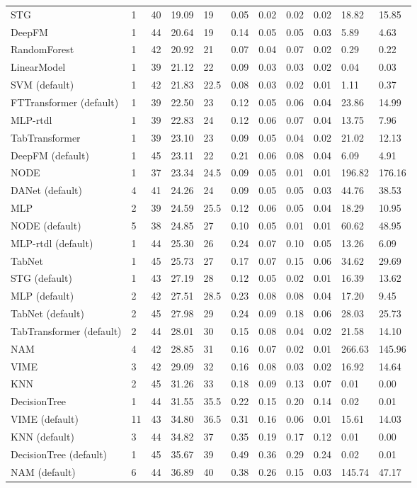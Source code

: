 \begin{tabular}{lllllllllll}
STG & 1 & 40 & 19.09 & 19 & 0.05 & 0.02 & 0.02 & 0.02 & 18.82 & 15.85 \\
DeepFM & 1 & 44 & 20.64 & 19 & 0.14 & 0.05 & 0.05 & 0.03 & 5.89 & 4.63 \\
RandomForest & 1 & 42 & 20.92 & 21 & 0.07 & 0.04 & 0.07 & 0.02 & 0.29 & 0.22 \\
LinearModel & 1 & 39 & 21.12 & 22 & 0.09 & 0.03 & 0.03 & 0.02 & 0.04 & 0.03 \\
SVM (default) & 1 & 42 & 21.83 & 22.5 & 0.08 & 0.03 & 0.02 & 0.01 & 1.11 & 0.37 \\
FTTransformer (default) & 1 & 39 & 22.50 & 23 & 0.12 & 0.05 & 0.06 & 0.04 & 23.86 & 14.99 \\
MLP-rtdl & 1 & 39 & 22.83 & 24 & 0.12 & 0.06 & 0.07 & 0.04 & 13.75 & 7.96 \\
TabTransformer & 1 & 39 & 23.10 & 23 & 0.09 & 0.05 & 0.04 & 0.02 & 21.02 & 12.13 \\
DeepFM (default) & 1 & 45 & 23.11 & 22 & 0.21 & 0.06 & 0.08 & 0.04 & 6.09 & 4.91 \\
NODE & 1 & 37 & 23.34 & 24.5 & 0.09 & 0.05 & 0.01 & 0.01 & 196.82 & 176.16 \\
DANet (default) & 4 & 41 & 24.26 & 24 & 0.09 & 0.05 & 0.05 & 0.03 & 44.76 & 38.53 \\
MLP & 2 & 39 & 24.59 & 25.5 & 0.12 & 0.06 & 0.05 & 0.04 & 18.29 & 10.95 \\
NODE (default) & 5 & 38 & 24.85 & 27 & 0.10 & 0.05 & 0.01 & 0.01 & 60.62 & 48.95 \\
MLP-rtdl (default) & 1 & 44 & 25.30 & 26 & 0.24 & 0.07 & 0.10 & 0.05 & 13.26 & 6.09 \\
TabNet & 1 & 45 & 25.73 & 27 & 0.17 & 0.07 & 0.15 & 0.06 & 34.62 & 29.69 \\
STG (default) & 1 & 43 & 27.19 & 28 & 0.12 & 0.05 & 0.02 & 0.01 & 16.39 & 13.62 \\
MLP (default) & 2 & 42 & 27.51 & 28.5 & 0.23 & 0.08 & 0.08 & 0.04 & 17.20 & 9.45 \\
TabNet (default) & 2 & 45 & 27.98 & 29 & 0.24 & 0.09 & 0.18 & 0.06 & 28.03 & 25.73 \\
TabTransformer (default) & 2 & 44 & 28.01 & 30 & 0.15 & 0.08 & 0.04 & 0.02 & 21.58 & 14.10 \\
NAM & 4 & 42 & 28.85 & 31 & 0.16 & 0.07 & 0.02 & 0.01 & 266.63 & 145.96 \\
VIME & 3 & 42 & 29.09 & 32 & 0.16 & 0.08 & 0.03 & 0.02 & 16.92 & 14.64 \\
KNN & 2 & 45 & 31.26 & 33 & 0.18 & 0.09 & 0.13 & 0.07 & 0.01 & 0.00 \\
DecisionTree & 1 & 44 & 31.55 & 35.5 & 0.22 & 0.15 & 0.20 & 0.14 & 0.02 & 0.01 \\
VIME (default) & 11 & 43 & 34.80 & 36.5 & 0.31 & 0.16 & 0.06 & 0.01 & 15.61 & 14.03 \\
KNN (default) & 3 & 44 & 34.82 & 37 & 0.35 & 0.19 & 0.17 & 0.12 & 0.01 & 0.00 \\
DecisionTree (default) & 1 & 45 & 35.67 & 39 & 0.49 & 0.36 & 0.29 & 0.24 & 0.02 & 0.01 \\
NAM (default) & 6 & 44 & 36.89 & 40 & 0.38 & 0.26 & 0.15 & 0.03 & 145.74 & 47.17 \\
\bottomrule
\end{tabular}
